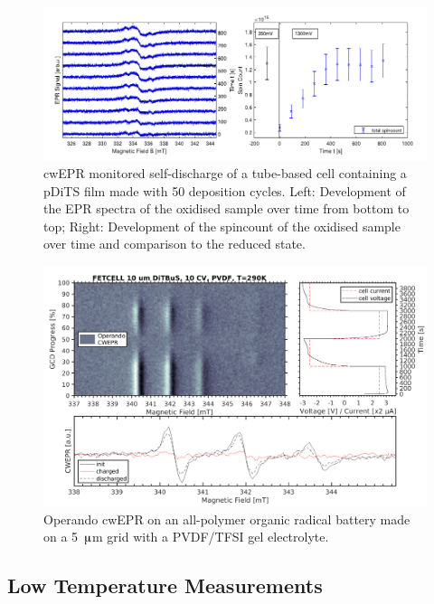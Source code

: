 \begin{figure}[h]
\center
	\includegraphics[width=1\textwidth]{./operando_epr/figures/self_discharge/DOM_DITS_SELF_DISCHARGE.pdf}
	\caption{cwEPR monitored self-discharge of a tube-based cell containing a pDiTS film made with 50 deposition cycles. Left: Development of the EPR spectra of the oxidised sample over time from bottom to top; Right: Development of the spincount of the oxidised sample over time and comparison to the reduced state.~\cite{DOM}}
	\label{fig:self_discharge_DOM}
\end{figure}





\begin{figure}[h]
\center
	\includegraphics[width=1\textwidth]{./operando_epr/figures/solid/FET231114_5uA_RT.pdf}
	\caption{Operando cwEPR on an all-polymer organic radical battery made on a 5~$\muup$m grid with a PVDF/TFSI gel electrolyte.}
	\label{fig:operando_solid_battery}
\end{figure}

\subsection{Low Temperature Measurements}

